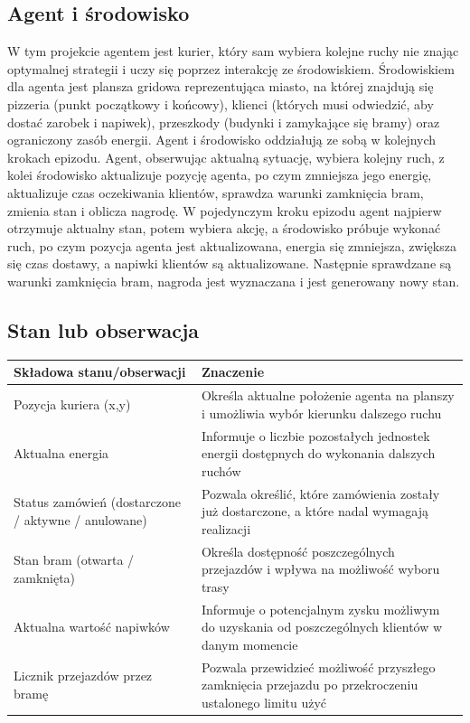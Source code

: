 \documentclass[12pt]{article}
\begin{document}
\subsection{Agent i środowisko}
W tym projekcie agentem jest kurier, który sam wybiera kolejne ruchy nie znając optymalnej strategii i uczy się poprzez interakcję ze środowiskiem. 
Środowiskiem dla agenta jest plansza gridowa reprezentująca miasto, na której znajdują się pizzeria (punkt początkowy i końcowy), klienci (których musi odwiedzić, aby dostać zarobek i napiwek), przeszkody (budynki i zamykające się bramy) oraz ograniczony zasób energii. 
Agent i środowisko oddziałują ze sobą w kolejnych krokach epizodu. Agent, obserwując aktualną sytuację, wybiera kolejny ruch, z kolei środowisko aktualizuje pozycję agenta, po czym zmniejsza jego energię, aktualizuje czas oczekiwania klientów, sprawdza warunki zamknięcia bram, zmienia stan i oblicza nagrodę.
W pojedynczym kroku epizodu agent najpierw otrzymuje aktualny stan, potem wybiera akcję, a środowisko próbuje wykonać ruch, po czym pozycja agenta jest aktualizowana, energia się zmniejsza, zwiększa się czas dostawy, a napiwki klientów są aktualizowane. Następnie sprawdzane są warunki zamknięcia bram, nagroda jest wyznaczana i jest generowany nowy stan.

\subsection{Stan lub obserwacja}
\begin{center}
\begin{tabular}{p{}p{}}
\toprule
Składowa stanu/obserwacji & Znaczenie \\
\midrule
Pozycja kuriera (x,y) & Określa aktualne położenie agenta na planszy i umożliwia wybór kierunku dalszego ruchu \\
Aktualna energia & Informuje o liczbie pozostałych jednostek energii dostępnych do wykonania dalszych ruchów \\
Status zamówień (dostarczone / aktywne / anulowane) & Pozwala określić, które zamówienia zostały już dostarczone, a które nadal wymagają realizacji \\
Stan bram (otwarta / zamknięta) & Określa dostępność poszczególnych przejazdów i wpływa na możliwość wyboru trasy \\
Aktualna wartość napiwków & Informuje o potencjalnym zysku możliwym do uzyskania od poszczególnych klientów w danym momencie \\
Licznik przejazdów przez bramę & Pozwala przewidzieć możliwość przyszłego zamknięcia przejazdu po przekroczeniu ustalonego limitu użyć \\
\bottomrule
\end{tabular}
\end{center}
\end{document}
